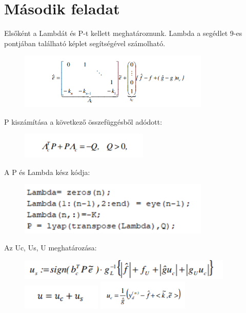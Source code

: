 \section{Második feladat}
Elsőként a Lambdát és P-t kellett meghatároznunk. Lambda a segédlet 9-es pontjában található képlet segítségével számolható.

\begin{figure}[!h]
	\centering
	\includegraphics[width=91mm, keepaspectratio]{figures/m03/fig2.png}
	\label{fig:fig1}
\end{figure}


P kiszámítása a következő összefüggésből adódott:

\begin{figure}[!h]
	\centering
	\includegraphics[width=61mm, keepaspectratio]{figures/m03/fig3.png}
	\label{fig:fig1}
\end{figure}
A P és Lambda kész kódja:

\begin{figure}[!h]
	\centering
	\includegraphics[width=91mm, keepaspectratio]{figures/m03/fig4.png}
	\label{fig:fig1}
\end{figure}
Az Uc, Us, U meghatározása:

\begin{figure}[!h]
	\centering
	\includegraphics[height=10mm, keepaspectratio]{figures/m03/fig5.png}\\\vspace{5mm}\hspace{5mm}
	\includegraphics[height=12mm, keepaspectratio]{figures/m03/fig6.png}\vspace{5mm}
	\includegraphics[height=14mm, keepaspectratio]{figures/m03/fig7.png}
	\label{fig:Dejong}
\end{figure}

